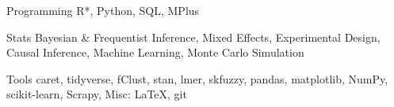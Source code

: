 

\begin{cvskills}

  \cvskill
    {Programming} %
    {R*, Python, SQL, MPlus} %

  \cvskill
    {Stats} %
    { Bayesian \& Frequentist Inference, Mixed Effects, Experimental Design, Causal Inference, Machine Learning, Monte Carlo Simulation} %

  \cvskill
    {Tools} %
    {caret, tidyverse, fClust, stan, lmer, skfuzzy, pandas, matplotlib, NumPy, scikit-learn, Scrapy, Misc: \LaTeX, git} %

\end{cvskills}

